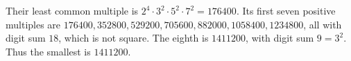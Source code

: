 Their least common multiple is $2^4\cdot3^2\cdot5^2\cdot7^2=176400$. Its first seven positive multiples are $176400,352800,529200,705600,882000,1058400,1234800$, all with digit sum $18$, which is not square. The eighth is $1411200$, with digit sum $9=3^2$. Thus the smallest is $\boxed{1411200}$.
